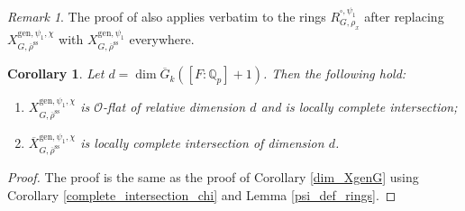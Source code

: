 \documentclass{amsart}
\newtheorem{cor}[prop]{Corollary}
\theoremstyle{definition}
\theoremstyle{remark}
\newtheorem{remar}[prop]{Remark}
\newcommand{\Qp}{\mathbb {Q}_p}
\newcommand{\OO}{\mathcal O}
\newcommand{\rhobar}{\overline{\rho}}
\newcommand{\gen}{\mathrm{gen}}
\newcommand{\Xbar}{\overline{X}}
\newcommand{\rhobarss}{\rhobar^{\mathrm{ss}}}
\newcommand{\Gbar}{\overline{G}}
\begin{document}
\begin{remar}\label{1313} The proof of  also applies verbatim to 
the rings $R^{\square,\psi_1}_{G, \rho_x}$ after  replacing $X^{\gen, \psi_1, \chi}_{G, \rhobarss}$ with $X^{\gen, \psi_1}_{G, \rhobarss}$ everywhere. 
\end{remar}



\begin{cor}\label{XgenG_chi_lci} Let $d= \dim \Gbar_k ([F:\Qp]+1)$. Then the following hold: 
\begin{enumerate} 
\item $X^{\gen,\psi_1, \chi}_{G, \rhobarss}$ is $\OO$-flat  of relative dimension $d$ and is locally complete intersection;
\item $\Xbar^{\gen,\psi_1, \chi}_{G, \rhobarss}$  is locally complete 
intersection of dimension $d$.
\end{enumerate} 
\end{cor}
\begin{proof} The proof is the same as the proof of Corollary \ref{dim_XgenG} using Corollary \ref{complete_intersection_chi}
and Lemma \ref{psi_def_rings}.
\end{proof} 
\end{document}
